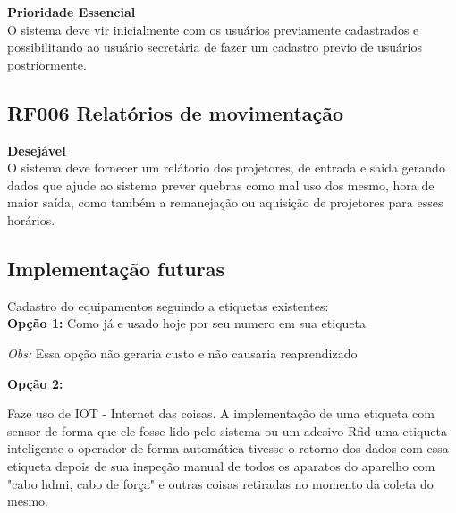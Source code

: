   \textbf{Prioridade Essencial} \\


  O sistema deve vir inicialmente com os usuários previamente cadastrados e
  possibilitando ao usuário secretária de fazer um cadastro previo de usuários
  postriormente.


\subsection{\textbf{RF006 Relatórios de movimentação}} 

  \textbf{Desejável} \\
  
  O sistema deve fornecer um relátorio dos projetores, de entrada e saida
  gerando dados que ajude ao sistema prever quebras como mal uso dos mesmo,
  hora de maior saída, como também a remanejação ou aquisição de projetores
  para esses horários. 


\subsection{\textbf{Implementação futuras}} 

  Cadastro do equipamentos seguindo a etiquetas existentes: 
  \\
  \textbf{Opção 1:} Como já e usado hoje por seu numero em sua etiqueta

  \textit{Obs:} Essa opção não geraria custo e não causaria reaprendizado
 
 
  \textbf{Opção 2:}
 
  Faze uso de IOT - Internet das coisas. A implementação de uma etiqueta com sensor de forma que ele fosse lido pelo
  sistema ou um adesivo Rfid uma etiqueta inteligente o operador de forma automática tivesse o retorno dos dados com
  essa etiqueta depois de sua inspeção manual de todos os aparatos do aparelho com "cabo hdmi, cabo de força" e outras
  coisas retiradas no momento da coleta do mesmo. 

